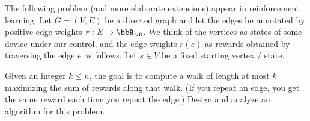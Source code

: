 \documentclass{article}
\begin{document}
 The following problem (and more elaborate extensions) appear in
reinforcement learning. Let $G = (V, E)$ be a directed graph and let the edges be
annotated by positive edge weights $r : E \to \bbR_{>0}$. We think of the vertices as states
of some device under our control, and the edge weights $r(e)$ as rewards obtained by
traversing the edge $e$ as follows. Let $s \in V$ be a fixed starting vertex / state.

\setcounter{section}{8}
\setcounter{exercise}{2}


\begin{subexercise}
Given an integer $ k\leq n $, the goal is to compute a walk of length at most $ k $ maximizing the sum of rewards along that walk. (If you repeat an edge, you get the same reward each time you repeat the edge.) Design and analyze an algorithm for this problem.
\end{subexercise}
\end{document}
